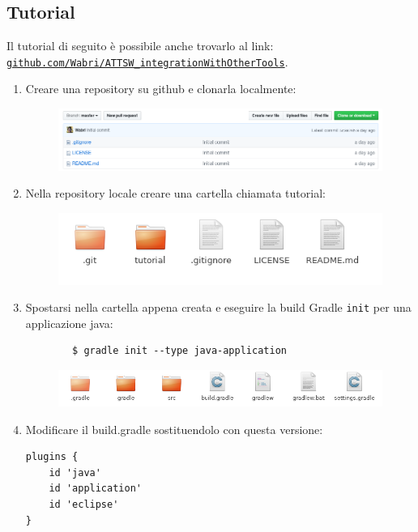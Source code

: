 \subsection{Tutorial}
Il tutorial di seguito è possibile anche trovarlo al link: \href{https://github.com/Wabri/ATTSW_integrationWithOtherTools/tree/master}{\texttt{github.com/Wabri/ATTSW\_integrationWithOtherTools}}.
\begin{enumerate}
    \item Creare una repository su github e clonarla localmente:
    \begin{figure}[H]
    \centering
    \includegraphics[width=1\linewidth]{4IntegrationWithOtherTool/tutorial/githubRepo.png}
    \end{figure}
    \item Nella repository locale creare una cartella chiamata tutorial:
    \begin{figure}[H]
    \centering
    \includegraphics[width=0.7\linewidth]{4IntegrationWithOtherTool/tutorial/localGithubRepo.png}
    \end{figure}
    \item Spostarsi nella cartella appena creata e eseguire la build Gradle \texttt{init} per una applicazione java:
    \begin{verbatim}
        $ gradle init --type java-application
    \end{verbatim}
    \begin{figure}[H]
    \centering
    \includegraphics[width=0.8\linewidth]{4IntegrationWithOtherTool/tutorial/gradleInit.png}
    \end{figure}
    \item Modificare il build.gradle sostituendolo con questa versione:
    \begin{lstlisting}[frame=single]
plugins {
    id 'java'
    id 'application'
    id 'eclipse'
}


\end{lstlisting}
\end{enumerate}
